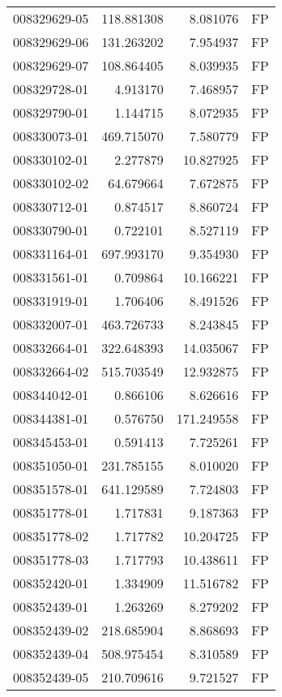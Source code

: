 \begin{tabular}{lrrl}
008329629-05 &  118.881308 &     8.081076 &   FP \\
008329629-06 &  131.263202 &     7.954937 &   FP \\
008329629-07 &  108.864405 &     8.039935 &   FP \\
008329728-01 &    4.913170 &     7.468957 &   FP \\
008329790-01 &    1.144715 &     8.072935 &   FP \\
008330073-01 &  469.715070 &     7.580779 &   FP \\
008330102-01 &    2.277879 &    10.827925 &   FP \\
008330102-02 &   64.679664 &     7.672875 &   FP \\
008330712-01 &    0.874517 &     8.860724 &   FP \\
008330790-01 &    0.722101 &     8.527119 &   FP \\
008331164-01 &  697.993170 &     9.354930 &   FP \\
008331561-01 &    0.709864 &    10.166221 &   FP \\
008331919-01 &    1.706406 &     8.491526 &   FP \\
008332007-01 &  463.726733 &     8.243845 &   FP \\
008332664-01 &  322.648393 &    14.035067 &   FP \\
008332664-02 &  515.703549 &    12.932875 &   FP \\
008344042-01 &    0.866106 &     8.626616 &   FP \\
008344381-01 &    0.576750 &   171.249558 &   FP \\
008345453-01 &    0.591413 &     7.725261 &   FP \\
008351050-01 &  231.785155 &     8.010020 &   FP \\
008351578-01 &  641.129589 &     7.724803 &   FP \\
008351778-01 &    1.717831 &     9.187363 &   FP \\
008351778-02 &    1.717782 &    10.204725 &   FP \\
008351778-03 &    1.717793 &    10.438611 &   FP \\
008352420-01 &    1.334909 &    11.516782 &   FP \\
008352439-01 &    1.263269 &     8.279202 &   FP \\
008352439-02 &  218.685904 &     8.868693 &   FP \\
008352439-04 &  508.975454 &     8.310589 &   FP \\
008352439-05 &  210.709616 &     9.721527 &   FP \\

\end{tabular}
